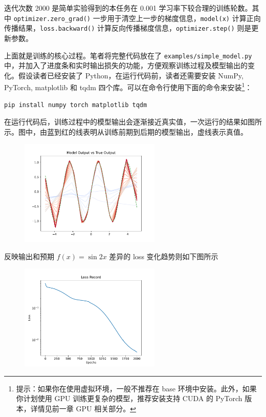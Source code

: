 迭代次数 2000 是简单实验得到的本任务在 0.001 学习率下较合理的训练轮数。其中 \texttt{optimizer.zero\_grad()} 一步用于清空上一步的梯度信息，\texttt{model(x)} 计算正向传播结果，\texttt{loss.backward()} 计算反向传播梯度信息，\texttt{optimizer.step()} 则是更新参数。

上面就是训练的核心过程。笔者将完整代码放在了 \texttt{examples/simple\_model.py} 中，并加入了进度条和实时输出损失的功能，方便观察训练过程及模型输出的变化。假设读者已经安装了 Python，在运行代码前，读者还需要安装 NumPy, PyTorch, matplotlib 和 tqdm 四个库。可以在命令行使用下面的命令来安装\footnote{提示：如果你在使用虚拟环境，一般不推荐在 base 环境中安装。此外，如果你计划使用 GPU 训练更复杂的模型，推荐安装支持 CUDA 的 PyTorch 版本，详情见前一章 GPU 相关部分。}：
\begin{verbatim}
pip install numpy torch matplotlib tqdm
\end{verbatim}

在运行代码后，训练过程中的模型输出会逐渐接近真实值，一次运行的结果如图所示。图中，由蓝到红的线表明从训练前期到后期的模型输出，虚线表示真值。
\begin{figure}[H]
    \centering
    \includegraphics[width=0.6\textwidth]{img/simple_model_output.pdf}
\end{figure}

反映输出和预期 $f(x) = \sin 2x$ 差异的 loss 变化趋势则如下图所示
\begin{figure}[H]
    \centering
    \includegraphics[width=0.6\textwidth]{img/simple_model_loss.pdf}
\end{figure}

